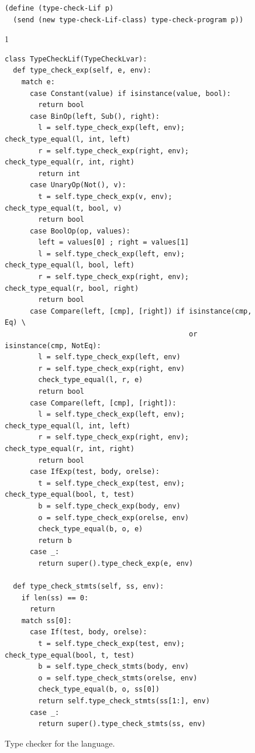 \documentclass[7x10]{TimesAPriori_MIT}%
\def\pythonEd{1}
\def\edition{1}
\newcommand{\pythonColor}[0]{}
\numberwithin{theorem}{chapter}
\numberwithin{definition}{chapter}
\numberwithin{equation}{chapter}
\begin{document}
\begin{figure}[tbp]
\begin{tcolorbox}[colback=white]
{\begin{lstlisting}[basicstyle=\ttfamily\footnotesize]
(define (type-check-Lif p)
  (send (new type-check-Lif-class) type-check-program p))
\end{lstlisting}
\fi}
{\if\edition\pythonEd\pythonColor
\begin{lstlisting}[basicstyle=\ttfamily\footnotesize]
class TypeCheckLif(TypeCheckLvar):
  def type_check_exp(self, e, env):
    match e:
      case Constant(value) if isinstance(value, bool):
        return bool
      case BinOp(left, Sub(), right):
        l = self.type_check_exp(left, env); check_type_equal(l, int, left)
        r = self.type_check_exp(right, env); check_type_equal(r, int, right)
        return int
      case UnaryOp(Not(), v):
        t = self.type_check_exp(v, env); check_type_equal(t, bool, v)
        return bool 
      case BoolOp(op, values):
        left = values[0] ; right = values[1]
        l = self.type_check_exp(left, env); check_type_equal(l, bool, left)
        r = self.type_check_exp(right, env); check_type_equal(r, bool, right)
        return bool
      case Compare(left, [cmp], [right]) if isinstance(cmp, Eq) \
                                            or isinstance(cmp, NotEq):
        l = self.type_check_exp(left, env)
        r = self.type_check_exp(right, env)
        check_type_equal(l, r, e)
        return bool
      case Compare(left, [cmp], [right]):
        l = self.type_check_exp(left, env); check_type_equal(l, int, left)
        r = self.type_check_exp(right, env); check_type_equal(r, int, right)
        return bool
      case IfExp(test, body, orelse):
        t = self.type_check_exp(test, env); check_type_equal(bool, t, test)
        b = self.type_check_exp(body, env)
        o = self.type_check_exp(orelse, env)
        check_type_equal(b, o, e)
        return b
      case _:
        return super().type_check_exp(e, env)

  def type_check_stmts(self, ss, env):
    if len(ss) == 0:
      return
    match ss[0]:
      case If(test, body, orelse):
        t = self.type_check_exp(test, env); check_type_equal(bool, t, test)
        b = self.type_check_stmts(body, env)
        o = self.type_check_stmts(orelse, env)
        check_type_equal(b, o, ss[0])
        return self.type_check_stmts(ss[1:], env)
      case _:
        return super().type_check_stmts(ss, env)
\end{lstlisting}
\fi}
\end{tcolorbox}
\caption{Type checker for the \LangIf{} language.}
\label{fig:type-check-Lif}
\end{figure}
\end{document}
